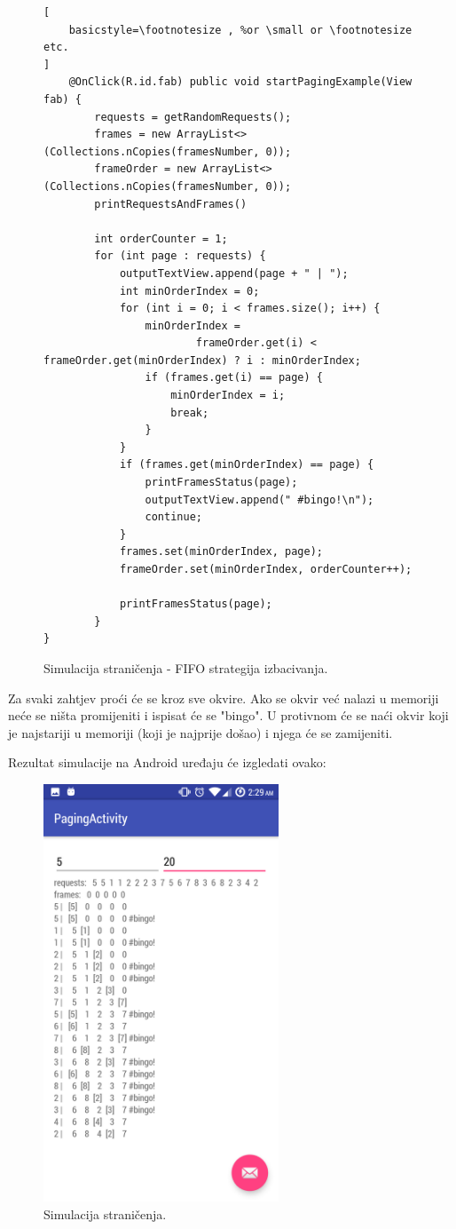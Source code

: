 \documentclass[times, utf8, zavrsni]{fer}
\begin{document}
\begin{figure}[ht!]
\begin{lstlisting}[
    basicstyle=\footnotesize , %or \small or \footnotesize etc.
]
    @OnClick(R.id.fab) public void startPagingExample(View fab) {
        requests = getRandomRequests();
        frames = new ArrayList<>(Collections.nCopies(framesNumber, 0));
        frameOrder = new ArrayList<>(Collections.nCopies(framesNumber, 0));	
		printRequestsAndFrames()
		
        int orderCounter = 1;
        for (int page : requests) {
            outputTextView.append(page + " | ");
            int minOrderIndex = 0;
            for (int i = 0; i < frames.size(); i++) {
                minOrderIndex =
                        frameOrder.get(i) < frameOrder.get(minOrderIndex) ? i : minOrderIndex;
                if (frames.get(i) == page) {
                    minOrderIndex = i;
                    break;
                }
            }
            if (frames.get(minOrderIndex) == page) {
                printFramesStatus(page);
                outputTextView.append(" #bingo!\n");
                continue;
            }
            frames.set(minOrderIndex, page);
            frameOrder.set(minOrderIndex, orderCounter++);

            printFramesStatus(page);
        }
}
\end{lstlisting}
\caption{Simulacija straničenja - FIFO strategija izbacivanja.}
\label{overflow}
\end{figure}
Za svaki zahtjev proći će se kroz sve okvire. Ako se okvir već nalazi u memoriji neće se ništa promijeniti i ispisat će se "bingo". U protivnom će se naći okvir koji je najstariji u memoriji (koji je najprije došao) i njega će se zamijeniti.\newpage

Rezultat simulacije na Android uređaju će izgledati ovako:
\begin{figure}[ht!]
\centering
\includegraphics[width=70mm]{img/PagingActivity.png}
\caption{Simulacija straničenja.}
\label{overflow}
\end{figure}
\end{document}
